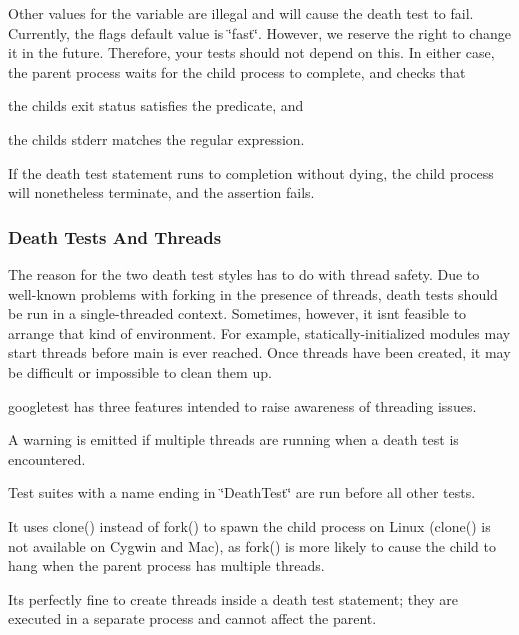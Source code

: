 Other values for the variable are illegal and will cause the death test to fail. Currently, the flag\textquotesingle{}s default value is \char`\"{}fast\char`\"{}. However, we reserve the right to change it in the future. Therefore, your tests should not depend on this. In either case, the parent process waits for the child process to complete, and checks that


\begin{DoxyEnumerate}
\item the child\textquotesingle{}s exit status satisfies the predicate, and
\item the child\textquotesingle{}s stderr matches the regular expression.
\end{DoxyEnumerate}

If the death test statement runs to completion without dying, the child process will nonetheless terminate, and the assertion fails.

\subsubsection*{Death Tests And Threads}

The reason for the two death test styles has to do with thread safety. Due to well-\/known problems with forking in the presence of threads, death tests should be run in a single-\/threaded context. Sometimes, however, it isn\textquotesingle{}t feasible to arrange that kind of environment. For example, statically-\/initialized modules may start threads before main is ever reached. Once threads have been created, it may be difficult or impossible to clean them up.

googletest has three features intended to raise awareness of threading issues.


\begin{DoxyEnumerate}
\item A warning is emitted if multiple threads are running when a death test is encountered.
\item Test suites with a name ending in \char`\"{}\+Death\+Test\char`\"{} are run before all other tests.
\item It uses {\ttfamily clone()} instead of {\ttfamily fork()} to spawn the child process on Linux ({\ttfamily clone()} is not available on Cygwin and Mac), as {\ttfamily fork()} is more likely to cause the child to hang when the parent process has multiple threads.
\end{DoxyEnumerate}

It\textquotesingle{}s perfectly fine to create threads inside a death test statement; they are executed in a separate process and cannot affect the parent.


